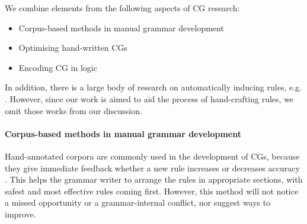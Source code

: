 We combine elements from the following aspects of CG research:

\begin{itemize}
\item Corpus-based methods in manual grammar development \cite{voutilainen2004}
\item Optimising hand-written CGs~\cite{bick2013tuning}
\item Encoding CG in logic \cite{lager98,lager_nivre01,listenmaa_claessen2015}
\end{itemize}

In addition, there is a large body of research on automatically inducing rules, e.g. \cite{inducing_cg1996,lindberg_eineborg98ilp}.
However, since our work is aimed to aid the process of hand-crafting rules, we omit those works from our discussion.


\paragraph{Corpus-based methods in manual grammar development}

Hand-annotated corpora are commonly used in the development of CGs, because they give immediate feedback whether a new rule increases or decreases accuracy \cite{voutilainen2004}.
This helps the grammar writer to arrange the rules in appropriate sections, with safest and most effective rules coming first.
However, this method will not notice a missed opportunity or a grammar-internal conflict, nor suggest ways to improve.




